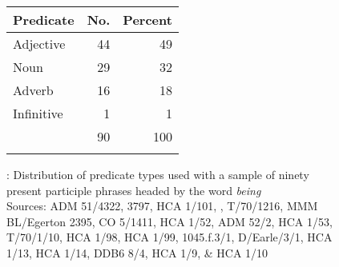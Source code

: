   
\begin{figure}


\begin{tabular}{lrr}
\lsptoprule
Predicate & No. & Percent\\
\midrule 
Adjective & 44 & 49\\
Noun & 29 & 32\\
Adverb & 16 & 18\\
Infinitive & 1 & 1\\
\midrule 
	& 90 & 100\\
\lspbottomrule	
\end{tabular}

\caption{\label{fig:key:5.1}: Distribution of predicate types used with a sample of ninety present participle phrases headed by the word \textit{being}\\
{\tiny Sources: ADM 51/4322, 3797, HCA 1/101, \citealt{Brown2011}, T/70/1216, MMM BL/Egerton 2395, CO 5/1411, HCA 1/52, ADM 52/2, HCA 1/53, T/70/1/10, HCA 1/98, HCA 1/99, 1045.f.3/1, D/Earle/3/1, HCA 1/13, HCA 1/14, DDB6 8/4, HCA 1/9, \& HCA 1/10}
}
\end{figure}

 

